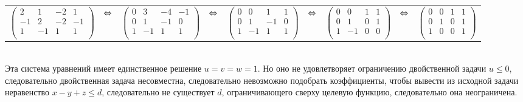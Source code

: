 \documentclass{article}
\begin{document}
	\begin{tabular}{ccccccccc}
		$\left(\begin{array}{ccc|c}
		2 	& 1 	& -2 	& 1	\\
		-1	& 2		& -2 	& -1	\\
		1	& -1	& 1 	& 1	\\
		\end{array}\right)$
		& $\hfill \Leftrightarrow \hfill$ &
		$\left(\begin{array}{ccc|c}
		0 	& 3 	& -4 	& -1	\\
		0	& 1		& -1 	& 0	\\
		1	& -1	& 1 	& 1	\\
		\end{array}\right)$
		& $\hfill \Leftrightarrow \hfill$ & 
		$\left(\begin{array}{ccc|c}
		0 	& 0 	& 1 	& 1	\\
		0	& 1		& -1 	& 0	\\
		1	& -1	& 1 	& 1	\\
		\end{array}\right)$
		& $\hfill \Leftrightarrow \hfill$ & 
		$\left(\begin{array}{ccc|c}
		0 	& 0 	& 1 	& 1	\\
		0	& 1		& 0 	& 1	\\
		1	& -1	& 0 	& 0	\\
		\end{array}\right)$
		& $\hfill \Leftrightarrow \hfill$ & 
		$\left(\begin{array}{ccc|c}
		0 	& 0 	& 1 	& 1	\\
		0	& 1		& 0 	& 1	\\
		1	& 0 	& 0 	& 1	\\
		\end{array}\right)$
	\end{tabular}\\
	\fontsize{12}{12}
	Эта система уравнений имеет единственное решение $u = v = w = 1$. Но оно не удовлетворяет ограничению двойственной задачи $u \leq 0$, следовательно двойственная задача несовместна, следовательно невозможно подобрать коэффициенты, чтобы вывести из исходной задачи неравенство $x-y+z \leq d$, следовательно не существует $d$, ограничивающего сверху целевую функцию, следовательно она неограничена. 
\end{document}
